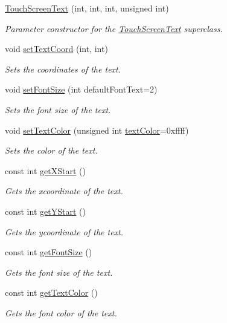 \begin{DoxyCompactItemize}
\item 
\hyperlink{class_touch_screen_text_a4603c93a9419c4a7ab81b24d7a925a7b}{Touch\+Screen\+Text} (int, int, int, unsigned int)
\begin{DoxyCompactList}\small\item\em Parameter constructor for the \hyperlink{class_touch_screen_text}{Touch\+Screen\+Text} superclass. \end{DoxyCompactList}\item 
void \hyperlink{class_touch_screen_text_ad93fb5b78ee2578fe3730210ba172ee7}{set\+Text\+Coord} (int, int)
\begin{DoxyCompactList}\small\item\em Sets the coordinates of the text. \end{DoxyCompactList}\item 
void \hyperlink{class_touch_screen_text_a38e3147716488c5f735fecf2a5930480}{set\+Font\+Size} (int default\+Font\+Text=2)
\begin{DoxyCompactList}\small\item\em Sets the font size of the text. \end{DoxyCompactList}\item 
void \hyperlink{class_touch_screen_text_a00c303a11bef10d5f7430acea9f5ea52}{set\+Text\+Color} (unsigned int \hyperlink{class_touch_screen_text_a0b555c473dff7436a79c836926235217}{text\+Color}=0xffff)
\begin{DoxyCompactList}\small\item\em Sets the color of the text. \end{DoxyCompactList}\item 
const int \hyperlink{class_touch_screen_text_ad4bf2d307ed2c96eed40969cdbdf4bcc}{get\+X\+Start} ()
\begin{DoxyCompactList}\small\item\em Gets the xcoordinate of the text. \end{DoxyCompactList}\item 
const int \hyperlink{class_touch_screen_text_a50372422c5ddb6c9b9f689a1e95e92ae}{get\+Y\+Start} ()
\begin{DoxyCompactList}\small\item\em Gets the ycoordinate of the text. \end{DoxyCompactList}\item 
const int \hyperlink{class_touch_screen_text_a34115eeb243b200e8546d7b203e8be54}{get\+Font\+Size} ()
\begin{DoxyCompactList}\small\item\em Gets the font size of the text. \end{DoxyCompactList}\item 
const int \hyperlink{class_touch_screen_text_ab1ba5d5526f00d925e5b0239901b7d50}{get\+Text\+Color} ()
\begin{DoxyCompactList}\small\item\em Gets the font color of the text. \end{DoxyCompactList}\end{DoxyCompactItemize}
